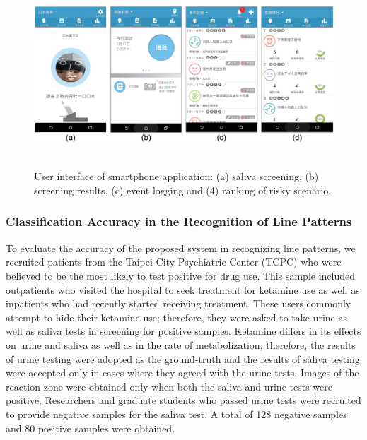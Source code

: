 \begin{figure}[ht]
\begin{center}
\includegraphics[height=6.9cm]{image/ket/ket_app}
\caption{User interface of smartphone application: (a) saliva screening, (b) screening results, (c) event logging and (4) ranking of risky scenario.}
\label{fig:phone_ui}
\end{center}
\end{figure}

\subsubsection{Classification Accuracy in the Recognition of Line Patterns}

To evaluate the accuracy of the proposed system in recognizing line patterns, we recruited patients from the Taipei City Psychiatric Center (TCPC) who were believed to be the most likely to test positive for drug use. This sample included outpatients who visited the hospital to seek treatment for ketamine use as well as inpatients who had recently started receiving treatment. These users commonly attempt to hide their ketamine use; therefore, they were asked to take urine as well as saliva tests in screening for positive samples. Ketamine differs in its effects on urine and saliva as well as in the rate of metabolization; therefore, the results of urine testing were adopted as the ground-truth and the results of saliva testing were accepted only in cases where they agreed with the urine tests. Images of the reaction zone were obtained only when both the saliva and urine tests were positive. Researchers and graduate students who passed urine tests were recruited to provide negative samples for the saliva test. A total of 128 negative samples and 80 positive samples were obtained.

